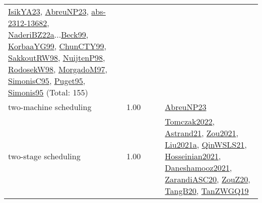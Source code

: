 {\begin{longtable}{p{3cm}r>{\raggedright\arraybackslash}p{6cm}>{\raggedright\arraybackslash}p{6cm}>{\raggedright\arraybackslash}p{8cm}}
\hyperref[detail:IsikYA23]{IsikYA23}, \hyperref[detail:AbreuNP23]{AbreuNP23}, \hyperref[detail:abs-2312-13682]{abs-2312-13682}, \hyperref[detail:NaderiBZ22a]{NaderiBZ22a}...\hyperref[detail:Beck99]{Beck99}, \hyperref[detail:KorbaaYG99]{KorbaaYG99}, \hyperref[detail:ChunCTY99]{ChunCTY99}, \hyperref[detail:SakkoutRW98]{SakkoutRW98}, \hyperref[detail:NuijtenP98]{NuijtenP98}, \hyperref[detail:RodosekW98]{RodosekW98}, \hyperref[detail:MorgadoM97]{MorgadoM97}, \hyperref[detail:SimonisC95]{SimonisC95}, \hyperref[detail:Puget95]{Puget95}, \hyperref[detail:Simonis95]{Simonis95} (Total: 155)\\
\index{two-machine scheduling}\index{Concepts!two-machine scheduling}two-machine scheduling &  1.00 &  &  & \hyperref[detail:AbreuNP23]{AbreuNP23}\\
\index{two-stage scheduling}\index{Concepts!two-stage scheduling}two-stage scheduling &  1.00 &  &  & \hyperref[detail:Tomczak2022]{Tomczak2022}, \hyperref[detail:Astrand21]{Astrand21}, \hyperref[detail:Zou2021]{Zou2021}, \hyperref[detail:Liu2021a]{Liu2021a}, \hyperref[detail:QinWSLS21]{QinWSLS21}, \hyperref[detail:Hosseinian2021]{Hosseinian2021}, \hyperref[detail:Daneshamooz2021]{Daneshamooz2021}, \hyperref[detail:ZarandiASC20]{ZarandiASC20}, \hyperref[detail:ZouZ20]{ZouZ20}, \hyperref[detail:TangB20]{TangB20}, \hyperref[detail:TanZWGQ19]{TanZWGQ19}\\

\end{longtable}}
